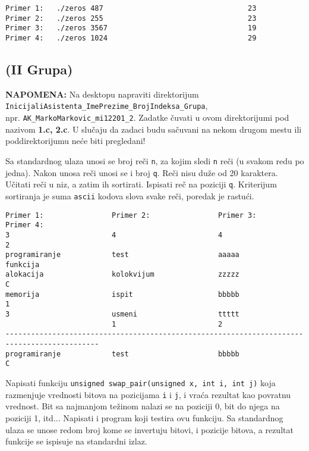 \begin{verbatim}
Primer 1:   ./zeros 487                                  23
Primer 2:   ./zeros 255                                  23
Primer 3:   ./zeros 3567                                 19
Primer 4:   ./zeros 1024                                 29
\end{verbatim}

\vskip 2cm

\subsection{(II Grupa)}

\textbf{NAPOMENA:} Na desktopu napraviti direktorijum
\verb|InicijaliAsistenta_ImePrezime_BrojIndeksa_Grupa|,
\\ npr. \verb|AK_MarkoMarkovic_mi12201_2|. Zadatke \v cuvati u ovom
direktorijumi pod nazivom \textbf{1.c, 2.c}.  U slu\v caju da zadaci
budu sa\v cuvani na nekom drugom mestu ili poddirektorijumu ne\'ce
biti pregledani!

\begin{z} Sa standardnog ulaza unosi se broj re\v{c}i \verb|n|,
za kojim sledi \verb|n| re\v{c}i (u svakom redu po jedna).  Nakon
unosa re\v ci unosi se i broj \verb|q|.  Re\v{c}i nisu du\v{z}e od 20
karaktera.  U\v{c}itati re\v{c}i u niz, a zatim ih sortirati. Ispisati
re\v c na poziciji \verb|q|.  Kriterijum sortiranja je suma
\verb|ascii| kodova slova svake re\v{c}i, poredak je rastu\'{c}i.
\end{z}

\begin{verbatim}
Primer 1:                Primer 2:                Primer 3:                   Primer 4:
3                        4                        4                           2
programiranje            test                     aaaaa                       funkcija
alokacija                kolokvijum               zzzzz                       C
memorija                 ispit                    bbbbb                       1
3                        usmeni                   ttttt
                         1                        2
--------------------------------------------------------------------------------------------
programiranje            test                     bbbbb                       C
\end{verbatim}

\begin{z} Napisati funkciju
  \verb|unsigned swap_pair(unsigned x, int i, int j)| koja razmenjuje
  vrednosti bitova na pozicijama \verb|i| i \verb|j|, i vra\'ca
  rezultat kao povratnu vrednost. Bit sa najmanjom te\v zinom nalazi
  se na poziciji 0, bit do njega na poziciji 1, itd... Napisati i
  program koji testira ovu funkciju. Sa standardnog ulaza se unose
  redom broj kome se invertuju bitovi, i pozicije bitova, a rezultat
  funkcije se ispisuje na standardni izlaz.
\end{z}


